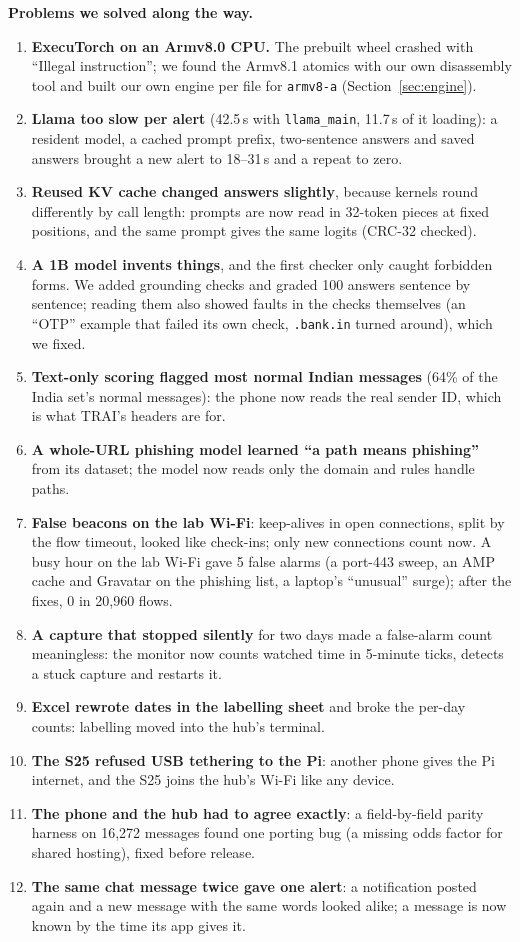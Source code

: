 \documentclass[11pt,a4paper]{article}
\newcommand{\code}[1]{\texttt{#1}}
\begin{document}
\textbf{Problems we solved along the way.}
\begin{enumerate}
  \item \textbf{ExecuTorch on an Armv8.0 CPU.} The prebuilt wheel crashed with ``Illegal instruction''; we found the
        Armv8.1 atomics with our own disassembly tool and built our own engine per file for \code{armv8-a}
        (Section~\ref{sec:engine}).
  \item \textbf{Llama too slow per alert} (42.5\,s with \code{llama\_main}, 11.7\,s of it loading): a resident model,
        a cached prompt prefix, two-sentence answers and saved answers brought a new alert to 18--31\,s and a repeat to
        zero.
  \item \textbf{Reused KV cache changed answers slightly}, because kernels round differently by call length: prompts
        are now read in 32-token pieces at fixed positions, and the same prompt gives the same logits (CRC-32 checked).
  \item \textbf{A 1B model invents things}, and the first checker only caught forbidden forms. We added grounding checks
        and graded 100 answers sentence by sentence; reading them also showed faults in the checks themselves (an ``OTP''
        example that failed its own check, \code{.bank.in} turned around), which we fixed.
  \item \textbf{Text-only scoring flagged most normal Indian messages} (64\% of the India set's normal messages): the
        phone now reads the real sender ID, which is what TRAI's headers are for.
  \item \textbf{A whole-URL phishing model learned ``a path means phishing''} from its dataset; the model now reads only
        the domain and rules handle paths.
  \item \textbf{False beacons on the lab Wi-Fi}: keep-alives in open connections, split by the flow timeout, looked like
        check-ins; only new connections count now. A busy hour on the lab Wi-Fi gave 5 false alarms (a port-443 sweep, an
        AMP cache and Gravatar on the phishing list, a laptop's ``unusual'' surge); after the fixes, 0 in 20,960 flows.
  \item \textbf{A capture that stopped silently} for two days made a false-alarm count meaningless: the monitor now
        counts watched time in 5-minute ticks, detects a stuck capture and restarts it.
  \item \textbf{Excel rewrote dates in the labelling sheet} and broke the per-day counts: labelling moved into the hub's
        terminal.
  \item \textbf{The S25 refused USB tethering to the Pi}: another phone gives the Pi internet, and the S25 joins the hub's
        Wi-Fi like any device.
  \item \textbf{The phone and the hub had to agree exactly}: a field-by-field parity harness on 16,272 messages found one
        porting bug (a missing odds factor for shared hosting), fixed before release.
  \item \textbf{The same chat message twice gave one alert}: a notification posted again and a new message with the same
        words looked alike; a message is now known by the time its app gives it.
\end{enumerate}
\end{document}
